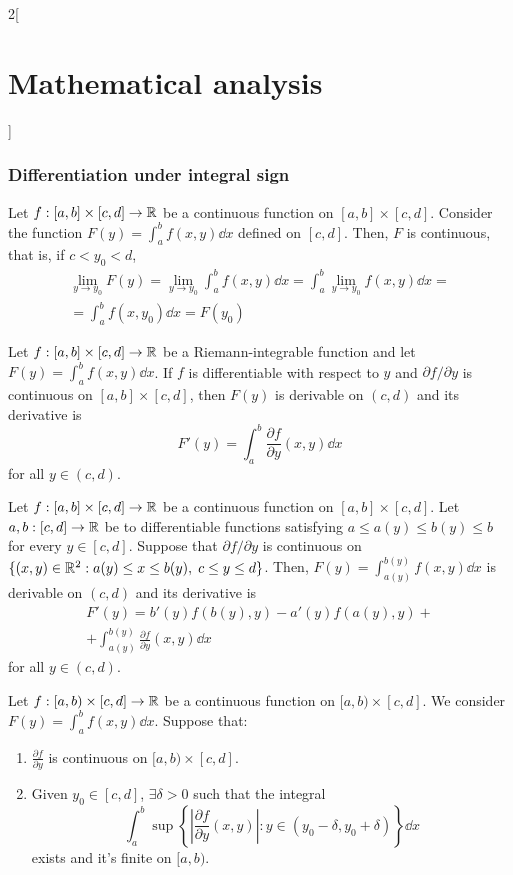 \documentclass[../../../main_math.tex]{subfiles}
\begin{document}
\begin{multicols}{2}[\section{Mathematical analysis}]
  \subsubsection{Differentiation under integral sign}
  \begin{theorem}
    Let $f:[a,b]\times[c,d]\rightarrow\mathbb{R} $ be a continuous function on $[a,b]\times[c,d]$. Consider the function $\displaystyle F(y)=\int_a^bf(x,y)\dd{x}$ defined on $[c,d]$. Then, $F$ is continuous, that is, if $c<y_0<d$,
    \begin{multline*}
      \lim_{y\to y_0}F(y)=\lim_{y\to y_0}\int_a^bf(x,y)\dd{x}=\int_a^b\lim_{y\to y_0}f(x,y)\dd{x}=\\=\int_a^bf(x,y_0)\dd{x}=F(y_0)
    \end{multline*}
  \end{theorem}
  \begin{theorem}
    Let $f:[a,b]\times[c,d]\rightarrow\mathbb{R} $ be a Riemann-integrable function and let $\displaystyle F(y)=\int_a^bf(x,y)\dd{x}$. If $f$ is differentiable with respect to $y$ and $\partial f/\partial y$ is continuous on $[a,b]\times[c,d]$, then $F(y)$ is derivable on $(c,d)$ and its derivative is $$F'(y)=\int_a^b\frac{\partial f}{\partial y}(x,y)\dd{x}$$ for all $y\in(c,d)$.
  \end{theorem}
  \begin{theorem}
    Let $f:[a,b]\times[c,d]\rightarrow\mathbb{R} $ be a continuous function on $[a,b]\times[c,d]$. Let $a,b:[c,d]\rightarrow\mathbb{R} $ be to differentiable functions satisfying $a\leq a(y)\leq b(y)\leq b$ for every $y\in[c,d]$. Suppose that $\partial f/\partial y$ is continuous on $\{(x,y)\in\mathbb{R}^2:a(y)\leq x\leq b(y),\; c\leq y\leq d\}$. Then, $\displaystyle F(y)=\int_{a(y)}^{b(y)}f(x,y)\dd{x}$ is derivable on $(c,d)$ and its derivative is
    \begin{multline*}
      F'(y)=b'(y)f(b(y),y)-a'(y)f(a(y),y)+\\+\int_{a(y)}^{b(y)}\frac{\partial f}{\partial y}(x,y)\dd{x}
    \end{multline*} for all $y\in(c,d)$.
  \end{theorem}
  \begin{theorem}
    Let $f:[a,b)\times[c,d]\rightarrow\mathbb{R} $ be a continuous function on $[a,b)\times[c,d]$. We consider $\displaystyle F(y)=\int_a^bf(x,y)\dd{x}$. Suppose that:
    \begin{enumerate}
      \item $\displaystyle\frac{\partial f}{\partial y}$ is continuous on $[a,b)\times[c,d]$.
      \item Given $y_0\in[c,d]$, $\exists\delta>0$ such that the integral $$\int_a^b\sup\left\{\left|\frac{\partial f}{\partial y}(x,y)\right|:y\in(y_0-\delta,y_0+\delta)\right\}\dd{x}$$ exists and it's finite on $[a,b)$.

\end{enumerate}
\end{theorem}
\end{multicols}
\end{document}
